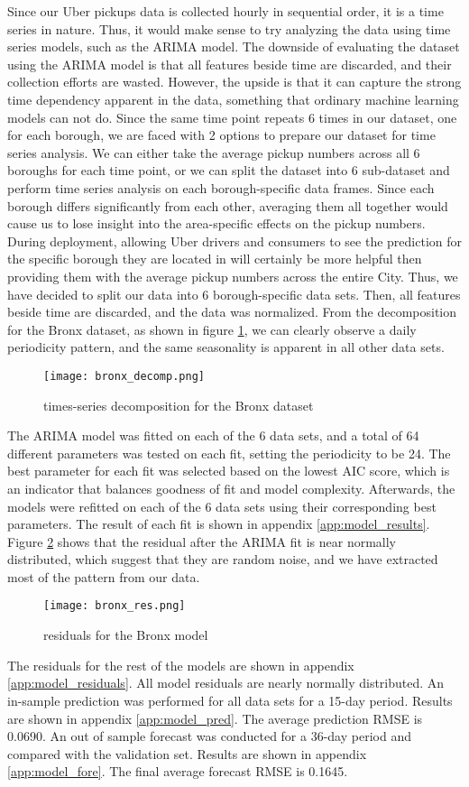 \documentclass[article, 10 pt, conference]{ieeeconf}
\begin{document}
Since our Uber pickups data is collected hourly in sequential order, it is a time series in nature. Thus, it would make sense to try analyzing the data using time series models, such as the ARIMA model. The downside of evaluating the dataset using the ARIMA model is that all features beside time are discarded, and their collection efforts are wasted. However, the upside is that it can capture the strong time dependency apparent in the data, something that ordinary machine learning models can not do. Since the same time point repeats 6 times in our dataset, one for each borough, we are faced with 2 options to prepare our dataset for time series analysis. We can either take the average pickup numbers across all 6 boroughs for each time point, or we can split the dataset into 6 sub-dataset and perform time series analysis on each borough-specific data frames. Since each borough differs significantly from each other, averaging them all together would cause us to lose insight into the area-specific effects on the pickup numbers. During deployment, allowing Uber drivers and consumers to see the prediction for the specific borough they are located in will certainly be more helpful then providing them with the average pickup numbers across the entire City. Thus, we have decided to split our data into 6 borough-specific data sets. Then, all features beside time are discarded, and the data was normalized. From the decomposition for the Bronx dataset, as shown in figure \ref{fig:bronx_decomp}, we can clearly observe a daily periodicity pattern, and the same seasonality is apparent in all other data sets. 
\begin{figure}[!htb]
    \texttt{[image: bronx\_decomp.png]}
    \caption{times-series decomposition for the Bronx dataset}
    \label{fig:bronx_decomp}
\end{figure}
The ARIMA model was fitted on each of the 6 data sets, and a total of 64 different parameters was tested on each fit, setting the periodicity to be 24. The best parameter for each fit was selected based on the lowest AIC score, which is an indicator that balances goodness of fit and model complexity. Afterwards, the models were refitted on each of the 6 data sets using their corresponding best parameters. The result of each fit is shown in appendix \ref{app:model_results}. Figure \ref{fig:bronx_res} shows that the residual after the ARIMA fit is near normally distributed, which suggest that they are random noise, and we have extracted most of the pattern from our data.
\begin{figure}[!htb]
    \texttt{[image: bronx\_res.png]}
    \caption{residuals for the Bronx model}
    \label{fig:bronx_res}
\end{figure}
The residuals for the rest of the models are shown in appendix \ref{app:model_residuals}. All model residuals are nearly normally distributed. An in-sample prediction was performed for all data sets for a 15-day period. Results are shown in appendix \ref{app:model_pred}. The average prediction RMSE is 0.0690. An out of sample forecast was conducted for a 36-day period and compared with the validation set. Results are shown in appendix \ref{app:model_fore}. The final average forecast RMSE is 0.1645.
\end{document}
